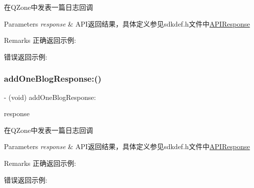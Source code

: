 在\+Q\+Zone中发表一篇日志回调 
\begin{DoxyParams}{Parameters}
{\em response} & A\+P\+I返回结果，具体定义参见sdkdef.\+h文件中\mbox{\hyperlink{interface_a_p_i_response}{A\+P\+I\+Response}} \\
\hline
\end{DoxyParams}
\begin{DoxyRemark}{Remarks}
正确返回示例\+: 
\begin{DoxyCodeInclude}
\end{DoxyCodeInclude}
 错误返回示例\+: 
\begin{DoxyCodeInclude}
\end{DoxyCodeInclude}

\end{DoxyRemark}
\mbox{\label{protocol_tencent_session_delegate-p_a3ba2a0c6a9f2444218b6acef8daf30d6}} 
\subsubsection{\texorpdfstring{add\+One\+Blog\+Response\+:()}{addOneBlogResponse:()}\hspace{0.1cm}{\footnotesize\ttfamily [2/2]}}
{\footnotesize\ttfamily -\/ (void) add\+One\+Blog\+Response\+: \begin{DoxyParamCaption}\item[{(\mbox{\hyperlink{interface_a_p_i_response}{A\+P\+I\+Response}} $\ast$)}]{response }\end{DoxyParamCaption}\hspace{0.3cm}{\ttfamily [optional]}}

在\+Q\+Zone中发表一篇日志回调 
\begin{DoxyParams}{Parameters}
{\em response} & A\+P\+I返回结果，具体定义参见sdkdef.\+h文件中\mbox{\hyperlink{interface_a_p_i_response}{A\+P\+I\+Response}} \\
\hline
\end{DoxyParams}
\begin{DoxyRemark}{Remarks}
正确返回示例\+: 
\begin{DoxyCodeInclude}
\end{DoxyCodeInclude}
 错误返回示例\+: 
\begin{DoxyCodeInclude}
\end{DoxyCodeInclude}

\end{DoxyRemark}
\mbox{\label{protocol_tencent_session_delegate-p_a216d645eacd9b1e25a941ba53dc1ee02}} 
